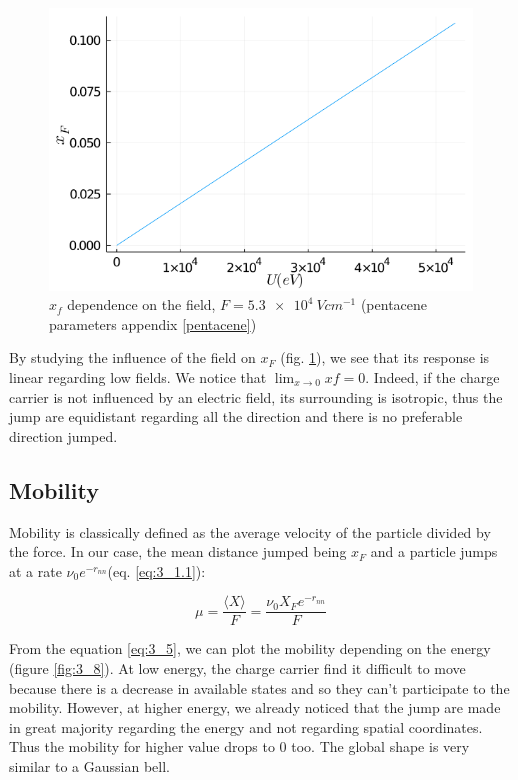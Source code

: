 \begin{figure}[!h]
    \centering
    \includegraphics*[width=.5\paperwidth]{figures/3_elec/field_xf.png}
    \caption{$x_f$ dependence on the field, $F = \SI{5.3e4}{V cm^{-1}}$ (pentacene parameters appendix \ref{pentacene})\label{fig:3_7}}
\end{figure}

By studying the influence of the field on $x_F$ (fig. \ref{fig:3_7}), we see that its response is linear regarding low fields. We notice that $\lim_{x\to 0} xf = 0$. Indeed, if the charge carrier is not influenced by an electric field, its surrounding is isotropic, thus the jump are equidistant regarding all the direction and there is no preferable direction jumped.

\subsection{Mobility}

Mobility is classically defined as the average velocity of the particle divided by the force. In our case, the mean distance jumped being $x_F$ and a particle jumps at a rate $\nu_0 e^{-r_{nn}}$(eq. \ref{eq:3_1.1}):

\begin{equation}
    \mu = \frac{\langle X \rangle}{F} = \dfrac{\nu_0 X_F e^{-r_{nn}}}{F}
    \label{eq:3_5}
\end{equation}

From the equation \ref{eq:3_5}, we can plot the mobility depending on the energy (figure \ref{fig:3_8}). At low energy, the charge carrier find it difficult to move because there is a decrease in available states and so they can't participate to the mobility. However, at higher energy, we already noticed that the jump are made in great majority regarding the energy and not regarding spatial coordinates. Thus the mobility for higher value drops to $0$ too. The global shape is very similar to a Gaussian bell.

